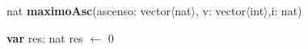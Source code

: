\vspace*{1cm}

nat  \textbf{maximoAsc}(ascenso: vector$\langle$nat$\rangle$, v: vector$\langle$int$\rangle$,i: nat)\\
	\begin{algorithm}[H]
	\BlankLine		
      \textbf{var} res: nat
      res $\leftarrow$ 0
	\BlankLine		
  \end{algorithm}



